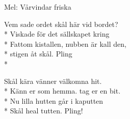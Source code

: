 \begin{SongText}
    \begin{SongInfo}
        Mel: Vårvindar friska
    \end{SongInfo}
    \begin{SongVerse}
        Vem sade ordet skål här vid bordet?\\*%
        Viskade för det sällskapet kring\\*%
        Fattom kistallen, nubben är kall den,\\*%
        stigen åt skål. Pling\\*%
    \end{SongVerse}
    \begin{SongVerse}
        Skål kära vänner välkomna hit.\\*%
        Känn er som hemma. tag er en bit.\\*%
        Nu lilla hutten går i kaputten\\*%
        Skål heal tutten. Pling!
    \end{SongVerse}
\end{SongText}